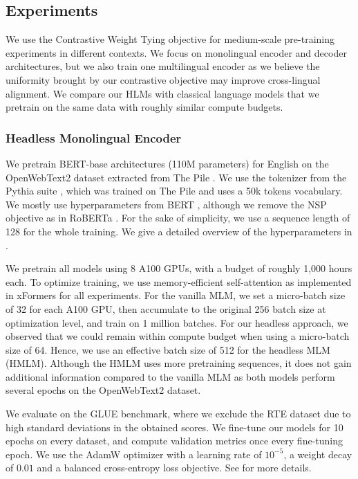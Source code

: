 \subsection{Experiments}
\label{sec:experiments}
We use the Contrastive Weight Tying objective for medium-scale pre-training experiments in different contexts. We focus on monolingual encoder and decoder architectures, but we also train one multilingual encoder as we believe the uniformity brought by our contrastive objective may improve cross-lingual alignment.
We compare our HLMs with classical language models that we pretrain on the same data with roughly similar compute budgets.

\subsubsection{Headless Monolingual Encoder}
\label{sec:mono_encoder}
We pretrain BERT-base architectures (110M parameters) for English on the OpenWebText2 dataset extracted from The Pile \citep{gao2020pile}. We use the tokenizer from the Pythia suite \citep{biderman2023pythia}, which was trained on The Pile and uses a 50k tokens vocabulary.
We mostly use hyperparameters from BERT \citep{devlin-etal-2019-bert}, although we remove the NSP objective as in RoBERTa \citep{roberta}. For the sake of simplicity, we use a sequence length of 128 for the whole training. We give a detailed overview of the hyperparameters in .

We pretrain all models using 8 A100 GPUs, with a budget of roughly 1,000 hours each. To optimize training, we use memory-efficient self-attention as implemented in xFormers \citep{xFormers2022} for all experiments. For the vanilla MLM, we set a micro-batch size of 32 for each A100 GPU, then accumulate to the original 256 batch size at optimization level, and train on 1 million batches. For our headless approach, we observed that we could remain within compute budget when using a micro-batch size of 64. Hence, we use an effective batch size of 512 for the headless MLM (HMLM). Although the HMLM uses more pretraining sequences, it does not gain additional information compared to the vanilla MLM as both models perform several epochs on the OpenWebText2 dataset.


We evaluate on the GLUE benchmark, where we exclude the RTE dataset due to high standard deviations in the obtained scores. We fine-tune our models for 10 epochs on every dataset, and compute validation metrics once every fine-tuning epoch. We use the AdamW optimizer with a learning rate of $10^{-5}$, a weight decay of $0.01$ and a balanced cross-entropy loss objective. See  for more details.

